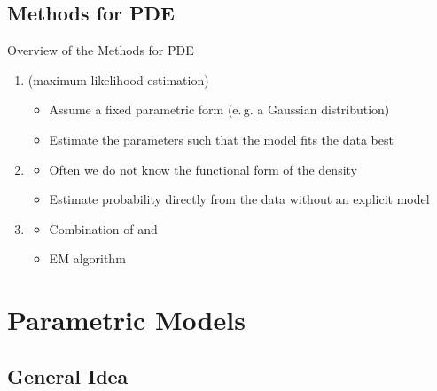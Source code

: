 \subsection{Methods for PDE}

\begin{frame}{Overview of the Methods for PDE}{}
	\begin{enumerate}
		\item {} (maximum likelihood estimation)
		\begin{itemize}
			\item Assume a fixed parametric form (e.\,g. a Gaussian distribution)
			\item Estimate the parameters such that the model fits the data best
		\end{itemize}
		\item {}
		\begin{itemize}
			\item Often we do not know the functional form of the density
			\item Estimate probability directly from the data without an explicit model
		\end{itemize}
		\item {}
		\begin{itemize}
			\item Combination of  and 
			\item EM algorithm
		\end{itemize}
	\end{enumerate}
\end{frame}


\section{Parametric Models}

\subsection{General Idea}


